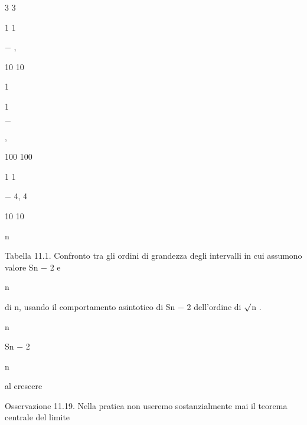 \documentclass[a4paper,portrait,12pt]{article}
\begin{document}
3 3


1 1


$-$ ,


10 10


1


1


$-$


,


100 100


1 1


$-$ 4, 4


10 10


\begin{flushleft}
n
\end{flushleft}





\begin{flushleft}
Tabella 11.1. Confronto tra gli ordini di grandezza degli intervalli in cui assumono valore Sn $-$ 2 e
\end{flushleft}


\begin{flushleft}
n
\end{flushleft}


\begin{flushleft}
di n, usando il comportamento asintotico di Sn $-$ 2 dell'ordine di $\surd$n .
\end{flushleft}





\begin{flushleft}
n
\end{flushleft}





\begin{flushleft}
Sn $-$ 2
\end{flushleft}


\begin{flushleft}
n
\end{flushleft}





\begin{flushleft}
al crescere
\end{flushleft}





\begin{flushleft}
Osservazione 11.19. Nella pratica non useremo sostanzialmente mai il teorema centrale del limite
\end{flushleft}
\end{document}
